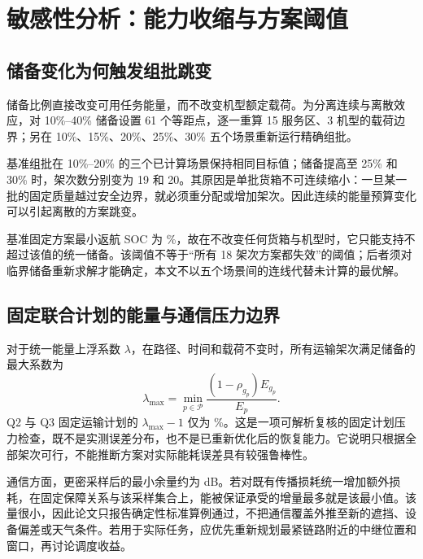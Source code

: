 \section{敏感性分析：能力收缩与方案阈值}
\subsection{储备变化为何触发组批跳变}
储备比例直接改变可用任务能量，而不改变机型额定载荷。为分离连续与离散效应，对 10\%--40\% 储备设置 61 个等距点，逐一重算 15 服务区、3 机型的载荷边界；另在 10\%、15\%、20\%、25\%、30\% 五个场景重新运行精确组批。

基准组批在 10\%--20\% 的三个已计算场景保持相同目标值；储备提高至 25\% 和 30\% 时，架次数分别变为 19 和 20。其原因是单批货箱不可连续缩小：一旦某一批的固定质量越过安全边界，就必须重分配或增加架次。因此连续的能量预算变化可以引起离散的方案跳变。

基准固定方案最小返航 SOC 为 \QOneReserveLimit\%，故在不改变任何货箱与机型时，它只能支持不超过该值的统一储备。该阈值不等于“所有 18 架次方案都失效”的阈值；后者须对临界储备重新求解才能确定，本文不以五个场景间的连线代替未计算的最优解。

\subsection{固定联合计划的能量与通信压力边界}
对于统一能量上浮系数 $\lambda$，在路径、时间和载荷不变时，所有运输架次满足储备的最大系数为
\begin{equation}
\lambda_{\max}=\min_{p\in\mathcal P}
\frac{(1-\rho_{g_p})E_{g_p}}{E_p}.
\label{eq:stress}
\end{equation}
Q2 与 Q3 固定运输计划的 \(\lambda_{\max}-1\) 仅为 \QThreeEnergyTolerance\%。这是一项可解析复核的固定计划压力检查，既不是实测误差分布，也不是已重新优化后的恢复能力。它说明只根据全部架次可行，不能推断方案对实际能耗误差具有较强鲁棒性。

通信方面，更密采样后的最小余量约为 \MarginHalf{} dB。若对既有传播损耗统一增加额外损耗，在固定保障关系与该采样集合上，能被保证承受的增量最多就是该最小值。该量很小，因此论文只报告确定性标准算例通过，不把通信覆盖外推至新的遮挡、设备偏差或天气条件。若用于实际任务，应优先重新规划最紧链路附近的中继位置和窗口，再讨论调度收益。
\FloatBarrier

